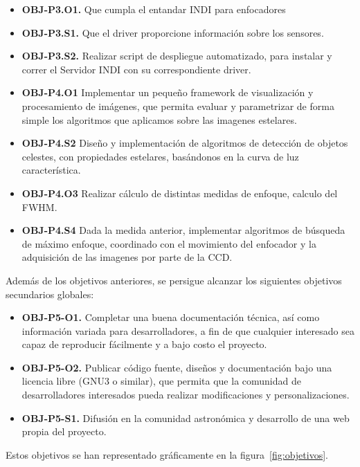 \begin{itemize}
  \item \textbf{OBJ-P3.O1.} Que cumpla el entandar INDI para enfocadores
  \item \textbf{OBJ-P3.S1.} Que el driver proporcione información sobre los sensores.
  \item \textbf{OBJ-P3.S2.} Realizar script de despliegue automatizado, para instalar y correr el Servidor INDI con su correspondiente driver.
\end{itemize}


\begin{itemize}
  \item \textbf{OBJ-P4.O1} Implementar un pequeño framework de visualización y procesamiento de imágenes, que permita evaluar y parametrizar de forma simple los algoritmos que aplicamos sobre las imagenes estelares.
  \item \textbf{OBJ-P4.S2} Diseño y implementación de algoritmos de detección de objetos celestes, con propiedades estelares, basándonos en la curva de luz característica.
  \item \textbf{OBJ-P4.O3} Realizar cálculo de distintas medidas de enfoque, calculo del FWHM.
  \item \textbf{OBJ-P4.S4} Dada la medida anterior, implementar algoritmos de búsqueda de máximo enfoque, coordinado con el movimiento del enfocador y la adquisición de las imagenes por parte de la CCD.

\end{itemize}

\bigskip
Además de los objetivos anteriores, se persigue alcanzar los siguientes objetivos secundarios globales:

\begin{itemize}
  \item \textbf{OBJ-P5-O1.} Completar una buena documentación técnica, así como información variada para desarrolladores, a fin de que cualquier interesado sea capaz de reproducir fácilmente y a bajo costo el proyecto.
  \item \textbf{OBJ-P5-O2.} Publicar código fuente, diseños y documentación bajo una licencia libre (GNU3 o similar), que permita que la comunidad de desarrolladores interesados pueda realizar modificaciones y personalizaciones.
  \item \textbf{OBJ-P5-S1.} Difusión en la comunidad astronómica y desarrollo de una web propia del proyecto.
\end{itemize}

Estos objetivos se han representado gráficamente en la figura~\ref{fig:objetivos}.

